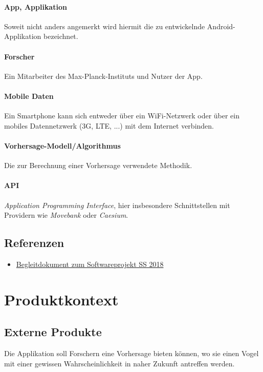 \documentclass[12pt]{article} %
\begin{document}
\paragraph{App, Applikation} Soweit nicht anders angemerkt wird hiermit die zu entwickelnde Android-Applikation bezeichnet.
 \paragraph{Forscher} Ein Mitarbeiter des Max-Planck-Instituts und Nutzer der App.
 \paragraph{Mobile Daten} Ein Smartphone kann sich entweder über ein WiFi-Netzwerk oder über ein mobiles Datennetzwerk (3G, LTE, ...) mit dem Internet verbinden. 
\paragraph{Vorhersage-Modell/Algorithmus} Die zur Berechnung einer Vorhersage verwendete Methodik. 
\paragraph{API} \textit{Application Programming Interface}, hier insbesondere Schnittstellen mit Providern wie \textit{Movebank} oder \textit{Caesium}. 

\subsection{Referenzen}

\begin{itemize} 
 	 \item  \href{https://docs.google.com/document/d/1Yc2f18JFaHyhrgM2h2WiATQ0zVmZnsc9W1ImhwWJF-g/edit?usp=sharing}{Begleitdokument zum Softwareprojekt SS 2018}
\end{itemize} 




\newpage
\section{Produktkontext} \label{kontext}

\subsection{Externe Produkte}
Die Applikation soll Forschern eine Vorhersage bieten können, wo sie einen Vogel mit einer gewissen Wahrscheinlichkeit in naher Zukunft antreffen werden. 
\end{document}
